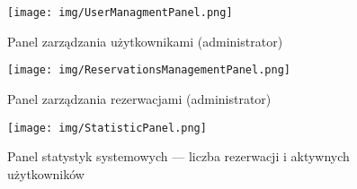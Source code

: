 \begin{figure}[H]
    \centering
    \texttt{[image: img/UserManagmentPanel.png]}
    \caption{Panel zarządzania użytkownikami (administrator)}
    \label{fig:adminusers}
\end{figure}

\begin{figure}[H]
    \centering
    \texttt{[image: img/ReservationsManagementPanel.png]}
    \caption{Panel zarządzania rezerwacjami (administrator)}
    \label{fig:adminreservations}
\end{figure}

\begin{figure}[H]
    \centering
    \texttt{[image: img/StatisticPanel.png]}
    \caption{Panel statystyk systemowych — liczba rezerwacji i aktywnych użytkowników}
    \label{fig:adminstats}
\end{figure}
